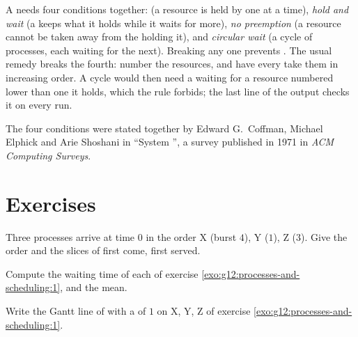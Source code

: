 A  needs four conditions together: \emph{} (a resource is held by one  at a time),
\emph{hold and wait} (a  keeps what it holds while it waits for more), \emph{no preemption} (a resource cannot
be taken away from the  holding it), and \emph{circular wait} (a cycle of processes, each waiting for the
next). Breaking any one prevents . The usual remedy breaks the fourth: number the resources, and have every
 take them in increasing order. A cycle would then need a  waiting for a resource numbered lower than
one it holds, which the rule forbids; the last line of the output checks it on every run.

\begin{history}
The four conditions were stated together by Edward G.\ Coffman, Michael Elphick and Arie Shoshani in ``System
'', a survey published in 1971 in \emph{ACM Computing Surveys}.
\end{history}

\section{Exercises}\label{sec:g12:processes-and-scheduling:exercises}

\begin{exercise}[$\star$]\label{exo:g12:processes-and-scheduling:1}
Three processes arrive at time $0$ in the order X (burst $4$), Y ($1$), Z ($3$). Give the order and the slices of first
come, first served.
\end{exercise}

\begin{exercise}[$\star$]\label{exo:g12:processes-and-scheduling:2}
Compute the waiting time of each  of exercise \ref{exo:g12:processes-and-scheduling:1}, and the mean.
\end{exercise}

\begin{exercise}[$\star$]\label{exo:g12:processes-and-scheduling:3}
Write the Gantt line of  with a  of $1$ on X, Y, Z of exercise
\ref{exo:g12:processes-and-scheduling:1}.
\end{exercise}

